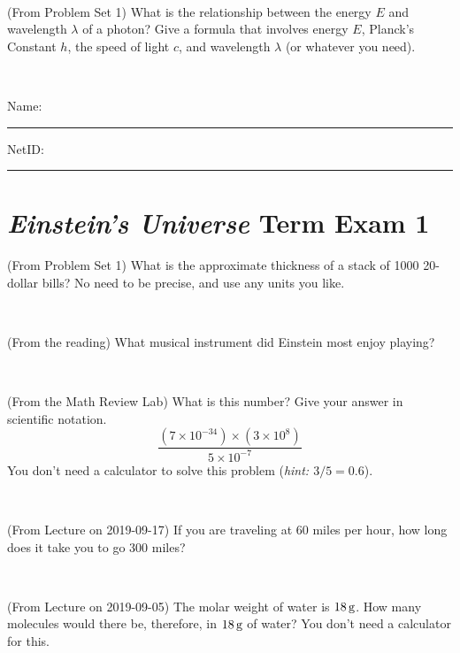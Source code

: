 \documentclass[12pt, letterpaper]{article}
\begin{document}
\vfill ~

\begin{problem} (From Problem Set 1)
What is the relationship between the energy $E$ and wavelength
$\lambda$ of a photon? Give a formula that involves energy $E$,
Planck's Constant $h$, the speed of light $c$, and wavelength
$\lambda$ (or whatever you need).
\end{problem}

\vfill ~


\cleardoublepage



\noindent
Name: \rule[-1ex]{0.60\textwidth}{0.1pt}
NetID: \rule[-1ex]{0.20\textwidth}{0.1pt}

\section*{\textsl{Einstein's Universe} Term Exam 1}
\setcounter{problem}{1}


\begin{problem} (From Problem Set 1)
What is the approximate thickness of a stack of 1000 20-dollar bills?
No need to be precise, and use any units you like.
\end{problem}


\vfill ~

\begin{problem} (From the reading)
What musical instrument did Einstein most enjoy playing?
\end{problem}


\vfill ~

\begin{problem} (From the Math Review Lab)
What is this number? Give your answer in scientific notation.
$$
\frac{(7\times10^{-34})\times(3\times10^8)}{5\times10^{-7}}
$$
You don't need a calculator to solve this problem (\textit{hint: $3/5=0.6$}).
\end{problem}


\vfill ~

\begin{problem} (From Lecture on 2019-09-17)
If you are traveling at 60 miles per hour, how long does
it take you to go 300 miles?
\end{problem}


\vfill ~


\clearpage


\begin{problem} (From Lecture on 2019-09-05)
The molar weight of water is $18\,\mathrm{g}$. How many molecules would there
be, therefore, in $18\,\mathrm{g}$ of water? You don't need a calculator for
this.
\end{problem}
\end{document}
